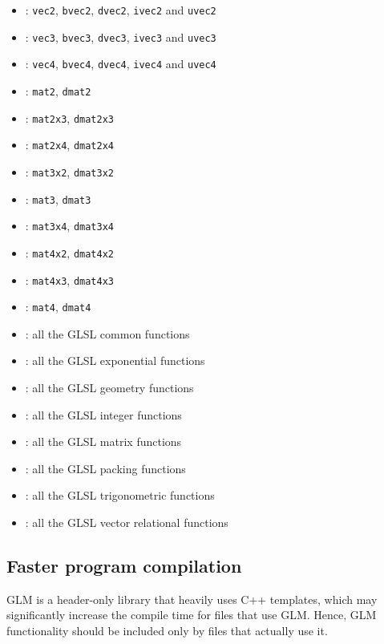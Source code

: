 \documentclass{scrartcl}
\numberwithin{figure}{subsection}
\begin{document}
\begin{itemize}
  \item {}: \verb|vec2|, \verb|bvec2|, \verb|dvec2|, \verb|ivec2| and \verb|uvec2|
  \item {}: \verb|vec3|, \verb|bvec3|, \verb|dvec3|, \verb|ivec3| and \verb|uvec3|
  \item {}: \verb|vec4|, \verb|bvec4|, \verb|dvec4|, \verb|ivec4| and \verb|uvec4|
  \item {}: \verb|mat2|, \verb|dmat2|
  \item {}: \verb|mat2x3|, \verb|dmat2x3|
  \item {}: \verb|mat2x4|, \verb|dmat2x4|
  \item {}: \verb|mat3x2|, \verb|dmat3x2|
  \item {}: \verb|mat3|, \verb|dmat3|
  \item {}: \verb|mat3x4|, \verb|dmat3x4|
  \item {}: \verb|mat4x2|, \verb|dmat4x2|
  \item {}: \verb|mat4x3|, \verb|dmat4x3|
  \item {}: \verb|mat4|, \verb|dmat4|
  \item {}: all the GLSL common functions
  \item {}: all the GLSL exponential functions
  \item {}: all the GLSL geometry functions
  \item {}: all the GLSL integer functions
  \item {}: all the GLSL matrix functions
  \item {}: all the GLSL packing functions
  \item {}: all the GLSL trigonometric functions
  \item {}: all the GLSL vector relational functions
\end{itemize}

\subsection{Faster program compilation}
GLM is a header-only library that heavily uses C++ templates, which may significantly increase the compile time for files that use GLM. Hence, GLM functionality should be included only by files that actually use it.
\end{document}
